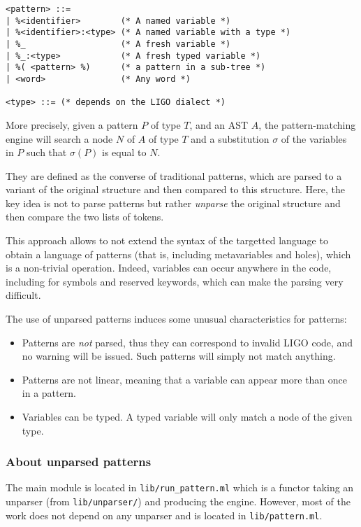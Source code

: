 \documentclass[10pt,a4paper]{article}
\begin{document}
\begin{verbatim}
<pattern> ::=
| %<identifier>        (* A named variable *)
| %<identifier>:<type> (* A named variable with a type *)
| %_                   (* A fresh variable *)
| %_:<type>            (* A fresh typed variable *)
| %( <pattern> %)      (* a pattern in a sub-tree *)
| <word>               (* Any word *)

<type> ::= (* depends on the LIGO dialect *)
\end{verbatim}

More precisely, given a pattern $P$ of type $T$, and an AST $A$, the
pattern-matching engine will search a node $N$ of $A$ of type $T$ and
a substitution $\sigma$ of the variables in $P$ such that $\sigma(P)$
is equal to $N$.

They are defined as the converse of traditional patterns, which are parsed to
a variant of the original structure and then compared to this structure.
Here, the key idea is not to parse patterns but rather \emph{unparse} the original
structure and then compare the two lists of tokens.

This approach allows to not extend the syntax of the targetted language to obtain
a language of patterns (that is, including metavariables and holes), which is a non-trivial
operation. Indeed, variables can occur anywhere in the code, including for symbols and
reserved keywords, which can make the parsing very difficult.

The use of unparsed patterns induces some unusual characteristics for patterns:
\begin{itemize}
\item
  Patterns are \emph{not} parsed, thus they can correspond to invalid
  LIGO code, and no warning will be issued. Such patterns will simply
  not match anything.

\item
  Patterns are not linear, meaning that a variable can appear more
  than once in a pattern.

\item
  Variables can be typed. A typed variable will only match a node of
  the given type.
\end{itemize}

\subsubsection{About unparsed patterns}

The main module is located in \verb|lib/run_pattern.ml| which is a
functor taking an unparser (from \verb|lib/unparser/|) and producing
the engine. However, most of the work does not depend on any unparser
and is located in \verb|lib/pattern.ml|.
\end{document}
